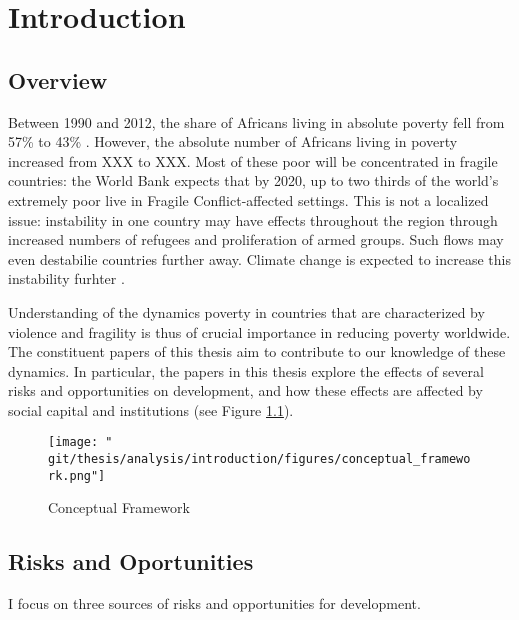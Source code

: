 \chapter{Introduction}
\section{Overview}



Between 1990 and 2012, the share of Africans living in absolute poverty fell from 57\% to 43\% \cite{WorldBank2016}. However, the absolute number of Africans living in poverty increased from XXX to XXX. Most of these poor will be concentrated in fragile countries: the World Bank expects that by 2020, up to two thirds of the world's extremely poor live in Fragile Conflict-affected settings. This is not a localized issue: instability in one country may have effects throughout the region through increased numbers of refugees and proliferation of armed groups. Such flows may even destabilie countries further away. Climate change is expected to increase this instability furhter \citep{Burke2009}.

Understanding of the dynamics poverty in countries that are characterized by violence and fragility is thus of crucial importance in reducing poverty worldwide. The constituent papers of this thesis aim to contribute to our knowledge of these dynamics. In particular, the papers in this thesis explore the effects of several risks and opportunities on development, and how these effects are affected by social capital and institutions (see Figure \ref{intro:fig:framework}).

\begin{figure}[htb]
  \centering
  \texttt{[image: "\\git/thesis/analysis/introduction/figures/conceptual\_framework.png"]}
  \caption{Conceptual Framework}
  \label{intro:fig:framework}
\end{figure}


\section{Risks and Oportunities}
I focus on three sources of risks and opportunities for development. 

